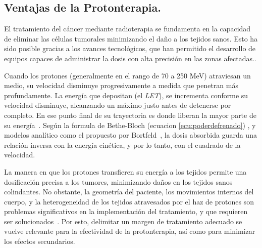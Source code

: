 \documentclass[onecolumn,12pt]{article} %
\begin{document}
\subsection{Ventajas de la Protonterapia.}
El tratamiento del cáncer mediante radioterapia se fundamenta en la capacidad de eliminar las células tumorales minimizando el daño a los tejidos sanos. Esto ha sido posible gracias a los avances tecnológicos, que han permitido el desarrollo de equipos capaces de administrar la dosis con alta precisión en las zonas afectadas.\cite{chen2017titulo}.


Cuando los protones (generalmente en el rango de 70 a 250 MeV) atraviesan un medio, su velocidad disminuye progresivamente a medida que penetran más profundamente. La energía que depositan (el \textit{LET}),  se incrementa conforme su velocidad disminuye, alcanzando un máximo justo antes de detenerse por completo. En ese punto final de su trayectoria es donde liberan la mayor parte de su energía~\cite{jones1999lack}. Según la formula de Bethe-Bloch (ecuacion \ref{ecu:poderdefrenado}) , y modelos analítico  como el propuesto por Bortfeld~\cite{bortfeld1997}, la dosis absorbida guarda una relación inversa con la energía cinética, y por lo tanto, con el cuadrado de la velocidad.

La manera en que los protones transfieren su energía a los tejidos permite una dosificación precisa a los tumores, minimizando daños en los tejidos sanos colindantes. No obstante, la geometría del paciente, los movimientos internos del cuerpo, y la heterogeneidad de los tejidos atravesados por el haz de protones son problemas significativos en la implementación del tratamiento, y que requieren ser solucionados~\cite{bras2024in}. Por esto, delimitar un margen de tratamiento adecuado se vuelve relevante para la efectividad de la protonterapia, así como para minimizar los efectos secundarios.
\end{document}

